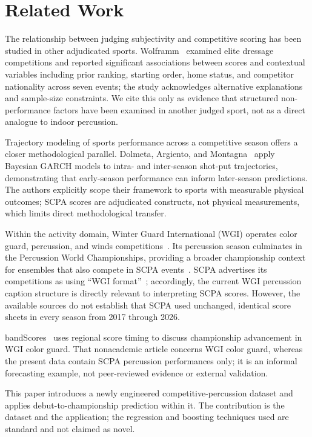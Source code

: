 \section{Related Work}
\label{sec:related-work}

The relationship between judging subjectivity and competitive scoring has been
studied in other adjudicated sports. Wolframm~\cite{wolframm2023bias} examined
elite dressage competitions and reported significant associations between scores
and contextual variables including prior ranking, starting order, home status,
and competitor nationality across seven events; the study acknowledges
alternative explanations and sample-size constraints. We cite this only as
evidence that structured non-performance factors have been examined in another
judged sport, not as a direct analogue to indoor percussion.

Trajectory modeling of sports performance across a competitive season offers a
closer methodological parallel. Dolmeta, Argiento, and
Montagna~\cite{dolmeta2023garch} apply Bayesian GARCH models to intra- and
inter-season shot-put trajectories, demonstrating that early-season performance
can inform later-season predictions. The authors explicitly scope their
framework to sports with measurable physical outcomes; SCPA scores are
adjudicated constructs, not physical measurements, which limits direct
methodological transfer.

Within the activity domain, Winter Guard International (WGI) operates color
guard, percussion, and winds competitions~\cite{wgiabout2026}. Its percussion
season culminates in the Percussion World Championships, providing a broader
championship context for ensembles that also compete in SCPA
events~\cite{wgipercussion2026}. SCPA advertises its competitions as using
``WGI format''~\cite{scpaabout2026}; accordingly, the current WGI percussion
caption structure is directly relevant to interpreting SCPA scores. However,
the available sources do not establish that SCPA used unchanged, identical
score sheets in every season from 2017 through 2026.

bandScores~\cite{bandscores2023probabilistic} uses regional score timing to
discuss championship advancement in WGI color guard. That nonacademic article
concerns WGI color guard, whereas the present data contain SCPA percussion
performances only; it is an informal forecasting example, not peer-reviewed
evidence or external validation.

This paper introduces a newly engineered competitive-percussion dataset and
applies debut-to-championship prediction within it. The contribution is the
dataset and the application; the regression and boosting techniques used are
standard and not claimed as novel.
